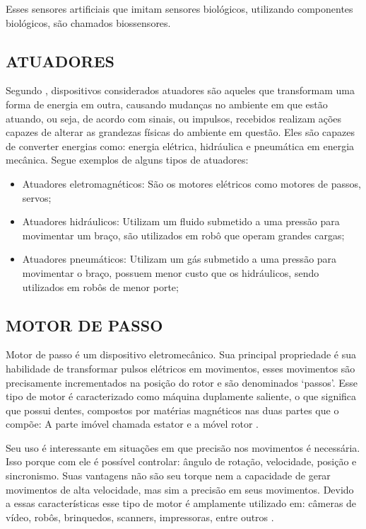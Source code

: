 Esses sensores artificiais que imitam sensores biológicos, utilizando componentes biológicos, são chamados biossensores.

\subsection{ATUADORES}
Segundo \cite{chironis1991mechanisms}, dispositivos considerados atuadores são aqueles que transformam uma forma de energia em outra, causando mudanças no ambiente em que estão atuando, ou seja, de acordo com sinais, ou impulsos, recebidos realizam ações capazes de alterar as grandezas físicas do ambiente em questão. Eles são capazes de converter energias como: energia elétrica, hidráulica e pneumática em energia mecânica. Segue exemplos de alguns tipos de atuadores:

\begin{itemize}
\item Atuadores eletromagnéticos: São os motores elétricos como motores de passos, servos;
\item Atuadores hidráulicos: Utilizam um fluido submetido a uma pressão para movimentar um braço, são utilizados em robô que operam grandes cargas;
\item Atuadores pneumáticos: Utilizam um gás submetido a uma pressão para movimentar o braço, possuem menor custo que os hidráulicos, sendo utilizados em robôs de menor porte;
\end{itemize}

\subsection{MOTOR DE PASSO}
Motor de passo é um dispositivo eletromecânico. Sua principal propriedade é sua habilidade de transformar pulsos elétricos em movimentos, esses movimentos são precisamente incrementados na posição do rotor e são denominados ‘passos’. Esse tipo de motor é caracterizado como máquina duplamente saliente, o que significa que possui dentes, compostos por matérias magnéticos nas duas partes que o compõe: A parte imóvel chamada estator e a móvel rotor \cite{demotor, acarnley2002stepping}.

Seu uso é interessante em situações em que precisão nos movimentos é necessária. Isso porque com ele é possível controlar: ângulo de rotação, velocidade, posição e sincronismo. Suas vantagens não são seu torque nem a capacidade de gerar movimentos de alta velocidade, mas sim a precisão em seus movimentos. Devido a essas características esse tipo de motor é amplamente utilizado em: câmeras de vídeo, robôs, brinquedos, scanners, impressoras, entre outros \cite{demotor}.

